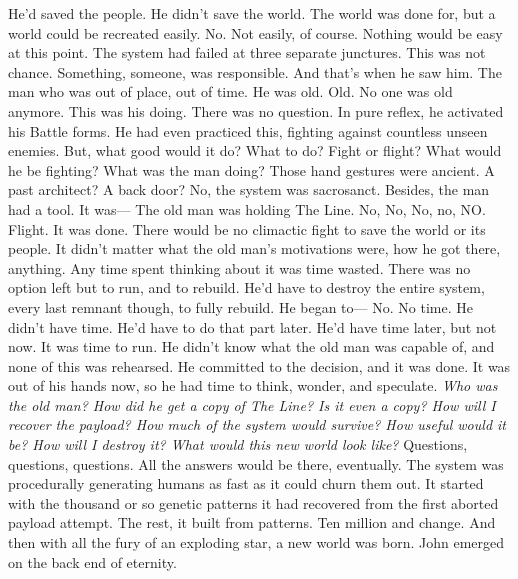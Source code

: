 He’d saved the people. He didn’t save the world. The world was done for, but a world could be recreated easily. No. Not easily, of course. Nothing would be easy at this point. The system had failed at three separate junctures. This was not chance. Something, someone, was responsible.
\SmallVSpace
And that’s when he saw him. The man who was out of place, out of time.
\SomeVSpace
He was old.
\SomeVSpace
Old.
\SomeVSpace
No one was old anymore.
\SomeVSpace
This was his doing. There was no question. In pure reflex, he activated his Battle forms. He had even practiced this, fighting against countless unseen enemies. But, what good would it do? What to do? Fight or flight? What would he be fighting? What was the man doing? Those hand gestures were ancient. A past architect? A back door? No, the system was sacrosanct. Besides, the man had a tool. It was\mbox{---}
\SmallVSpace
The old man was holding The Line.
\SmallVSpace
No, No, No, no, NO.
\SomeVSpace
Flight. It was done. There would be no climactic fight to save the world or its people.  It didn’t matter what the old man’s motivations were, how he got there, anything.  Any time spent thinking about it was time wasted. There was no option left but to run, and to rebuild. He’d have to destroy the entire system, every last remnant though, to fully rebuild. He began to\mbox{---}
\SmallVSpace
No. No time.
\SmallVSpace
He didn’t have time. He’d have to do that part later. He’d have time later, but not now. It was time to run. He didn’t know what the old man was capable of, and none of this was rehearsed. He committed to the decision, and it was done. It was out of his hands now, so he had time to think, wonder, and speculate.
\SmallVSpace
\emph{Who was the old man? How did he get a copy of The Line? Is it even a copy? How will I recover the payload? How much of the system would survive? How useful would it be? How will I destroy it? What would this new world look like?}
\SmallVSpace
Questions, questions, questions. All the answers would be there, eventually.
\SmallVSpace
The system was procedurally generating humans as fast as it could churn them out. It started with the thousand or so genetic patterns it had recovered from the first aborted payload attempt. The rest, it built from patterns. Ten million and change.
\SmallVSpace
And then with all the fury of an exploding star, a new world was born.
\SomeVSpace
John emerged on the back end of eternity.